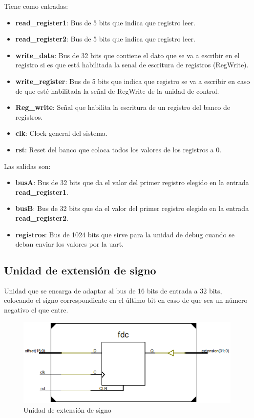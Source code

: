 Tiene como entradas:
\begin{itemize}
  \item \textbf{read\_register1}: Bus de 5 bits que indica que registro leer.
  \item \textbf{read\_register2}: Bus de 5 bits que indica que registro leer.
  \item \textbf{write\_data}: Bus de 32 bits que contiene el dato que se va a escribir en el registro si es que est\'a habilitada la senal de escritura de registros (RegWrite).
  \item \textbf{write\_register}: Bus de 5 bits que indica que registro se va a escribir en caso de que est\'e habilitada la señal de RegWrite de la unidad de control.
  \item \textbf{Reg\_write}: Señal que habilita la escritura de un registro del banco de registros.
  \item \textbf{clk}: Clock general del sistema.
  \item \textbf{rst}: Reset del banco que coloca todos los valores de los registros a 0.  
\end{itemize}

Las salidas son:
\begin{itemize}
  \item \textbf{busA}: Bus de 32 bits que da el valor del primer registro elegido en la entrada \textbf{read\_register1}.
  \item \textbf{busB}: Bus de 32 bits que da el valor del primer registro elegido en la entrada \textbf{read\_register2}.
  \item \textbf{registros}: Bus de 1024 bits que sirve para la unidad de debug cuando se deban enviar los valores por la uart.
\end{itemize}

\subsection{Unidad de extensi\'on de signo}
Unidad que se encarga de adaptar al bus de 16 bits de entrada a 32 bits, colocando el signo correspondiente en el \'ultimo bit en caso de que sea un n\'umero negativo el que entre.

\begin{figure}[H]
\centering
\includegraphics[scale=0.5]{img/extension_signo_inside}
\caption{Unidad de extensi\'on de signo}
\label{fig:sign_extended}
\end{figure}


